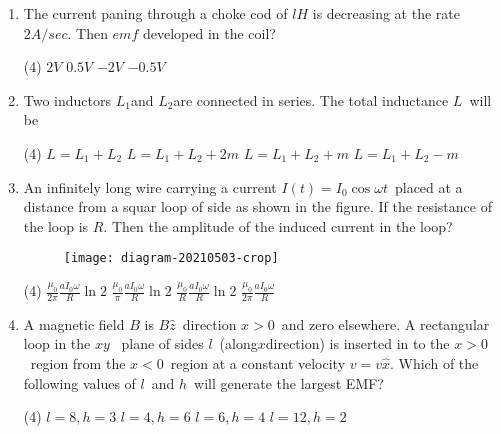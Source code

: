 \begin{enumerate}[ label=\color{ocre}\textbf{\arabic*.}]
	\begin{tasks}(4)
		\task[\textbf{a.}]$\frac{\pi a^2\omega B_0 \cos\omega t}{4R}$ 
		\task[\textbf{b.}]$\frac{\pi a^2\omega B_0 \sin\omega t}{4R}$ 
		\task[\textbf{c.}]$\frac{\pi a^2\omega B_0 \cos\omega t}{4R}$ 
		\task[\textbf{d.}]$\frac{\pi a^2\omega B_0 \sin\omega t}{2R}$ 
	\end{tasks}
	\item The current paning through a choke cod of $lH$ is decreasing at the rate $2A/sec$. Then $emf$ developed in the coil?
	\begin{tasks}(4)
		\task[\textbf{a.}]$2V$
		\task[\textbf{b.}]$0.5V $
		\task[\textbf{c.}]$-2V$
		\task[\textbf{d.}]$-0.5V$
	\end{tasks}
	\item Two inductors $L_1$and $L_2$are connected in series. The total inductance $L$\ will be
	\begin{tasks}(4)
		\task[\textbf{a.}]$L=L_1+L_2$
		\task[\textbf{b.}]$L=L_1+L_2+2m$
		\task[\textbf{c.}]$L=L_1+L_2+m$
		\task[\textbf{d.}]$L=L_1+L_2-m$
	\end{tasks}
	\item An infinitely long wire carrying a current $I(t)=I_0\cos\omega t$\ placed at a distance from a squar loop of side as shown in the figure. If the resistance of the loop is $R.$ Then the amplitude of the induced current in the loop?
	\begin{figure}[H]
		\begin{center}
			\texttt{[image: diagram-20210503-crop]}
		\end{center}
	\end{figure}
	\begin{tasks}(4)
		\task[\textbf{a.}]$\frac{\mu_0}{2\pi}\frac{aI_0\omega}{R}\ln 2$
		\task[\textbf{b.}]$\frac{\mu_0}{\pi}\frac{aI_0\omega}{R}\ln 2$
		\task[\textbf{c.}]$\frac{\mu_0}{R}\frac{aI_0\omega}{R}\ln 2$
		\task[\textbf{d.}]$\frac{\mu_0}{2\pi}\frac{aI_0\omega}{R}$
	\end{tasks}
	\item A magnetic field $B$ is $B\hat{z}$\ direction $x>0$\ and zero elsewhere. A rectangular loop in the $xy$ \ plane of sides $l$\ (along$x$direction) is inserted in to the $x>0$\  region from the $x<0$\ region at a constant velocity $v=v\hat{x}$. Which of the following values of $l$\ and $h$\  will generate the largest EMF?
	\begin{tasks}(4)
		\task[\textbf{a.}]$l=8,h=3$
		\task[\textbf{b.}]$l=4,h=6$
		\task[\textbf{c.}]$l=6,h=4$
		\task[\textbf{d.}]$l=12,h=2$

\end{tasks}
\end{enumerate}
